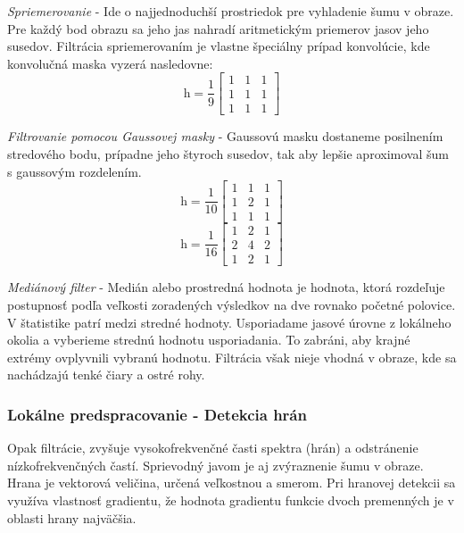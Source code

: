 \textit{Spriemerovanie} - Ide o najjednoduchší prostriedok pre vyhladenie šumu v obraze. Pre každý bod obrazu sa jeho jas nahradí aritmetickým priemerov jasov jeho susedov. Filtrácia spriemerovaním je vlastne špeciálny prípad konvolúcie, kde konvolučná maska vyzerá nasledovne:
$$\textit{h}=\frac{1}{9}\begin{bmatrix} 1 & 1 & 1 \\ 1 & 1 & 1 \\ 1 & 1 & 1  \end{bmatrix}$$

\textit{Filtrovanie pomocou Gaussovej masky} - Gaussovú masku dostaneme posilnením stredového bodu, prípadne jeho štyroch susedov, tak aby lepšie aproximoval šum s gaussovým rozdelením.
$$\textit{h}=\frac{1}{10}\begin{bmatrix} 1 & 1 & 1 \\ 1 & 2 & 1 \\ 1 & 1 & 1  \end{bmatrix}$$
$$\textit{h}=\frac{1}{16}\begin{bmatrix} 1 & 2 & 1 \\ 2 & 4 & 2 \\ 1 & 2 & 1  \end{bmatrix}$$

\textit{Mediánový filter} - Medián alebo prostredná hodnota je hodnota, ktorá rozdeľuje postupnosť podľa veľkosti zoradených výsledkov na dve rovnako početné polovice. V štatistike patrí medzi stredné hodnoty. Usporiadame jasové úrovne z lokálneho okolia a vyberieme strednú hodnotu usporiadania. To zabráni, aby krajné extrémy ovplyvnili vybranú hodnotu. Filtrácia však nieje vhodná v obraze, kde sa nachádzajú tenké čiary a ostré rohy. 


\subsubsection{Lokálne predspracovanie - Detekcia hrán}
Opak filtrácie, zvyšuje vysokofrekvenčné časti spektra (hrán) a odstránenie nízkofrekvenčných častí. Sprievodný javom je aj zvýraznenie šumu v obraze.  Hrana je vektorová veličina, určená veľkostnou a smerom. Pri hranovej detekcii sa využíva vlastnosť gradientu, že hodnota gradientu funkcie dvoch premenných je v oblasti hrany najväčšia. 

